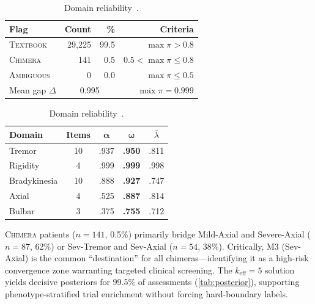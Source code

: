 \documentclass[runningheads]{llncs}
\begin{document}
\begin{table}[t]
\begin{minipage}[t]{0.47\textwidth}
\centering
\caption{Posterior divergence diagnostics.}\label{tab:posterior}
{\footnotesize
\begin{tabular}{lrrr}
\toprule
\textbf{Flag} & \textbf{Count} & \textbf{\%} & \textbf{Criteria} \\
\midrule
\textsc{Textbook} & 29{,}225 & 99.5 & $\max\pi{>}0.8$ \\
\textsc{Chimera} & 141 & 0.5 & $0.5{<}\max\pi{\leq}0.8$ \\
\textsc{Ambiguous} & 0 & 0.0 & $\max\pi{\leq}0.5$ \\
\midrule
Mean gap $\Delta$ & \multicolumn{2}{c}{0.995} & $\overline{\max\pi}{=}0.999$ \\
\bottomrule
\end{tabular}
}
\end{minipage}\hfill
\begin{minipage}[t]{0.50\textwidth}
\centering
\caption{Domain reliability~\cite{mcneish2018thanks}.}\label{tab:cfa}
{\footnotesize
\begin{tabular}{lcccc}
\toprule
\textbf{Domain} & \textbf{Items} & $\boldsymbol{\alpha}$ & $\boldsymbol{\omega}$ & $\bar{\lambda}$ \\
\midrule
Tremor       & 10 & .937 & \textbf{.950} & .811 \\
Rigidity     &  4 & .999 & \textbf{.999} & .998 \\
Bradykinesia & 10 & .888 & \textbf{.927} & .747 \\
Axial        &  4 & .525 & \textbf{.887} & .814 \\
Bulbar       &  3 & .375 & \textbf{.755} & .712 \\
\bottomrule
\end{tabular}
}
\end{minipage}
\end{table}

\textsc{Chimera} patients ($n{=}141$, 0.5\%) primarily bridge Mild-Axial and Severe-Axial ($n{=}87$, 62\%) or Sev-Tremor and Sev-Axial ($n{=}54$, 38\%). Critically, M3 (Sev-Axial) is the common ``destination'' for all chimeras---identifying it as a high-risk convergence zone warranting targeted clinical screening. The $k_{\mathrm{eff}}{=}5$ solution yields decisive posteriors for 99.5\% of assessments (\cref{tab:posterior}), supporting phenotype-stratified trial enrichment without forcing hard-boundary labels.
\end{document}
